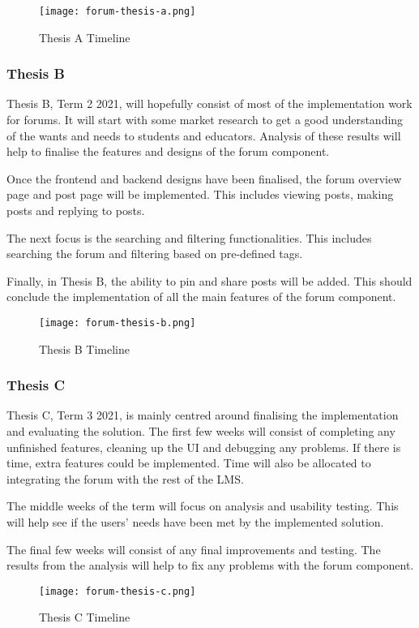 \begin{figure}[h!]
    \texttt{[image: forum-thesis-a.png]}
    \centering
    \caption{Thesis A Timeline}
\end{figure}

\newpage

\subsubsection{Thesis B}
Thesis B, Term 2 2021, will hopefully consist of most of the implementation work for forums.
It will start with some market research to get a good understanding of the wants and needs to students and educators.
Analysis of these results will help to finalise the features and designs of the forum component.

Once the frontend and backend designs have been finalised, the forum overview page and post page will be implemented.
This includes viewing posts, making posts and replying to posts.

The next focus is the searching and filtering functionalities.
This includes searching the forum and filtering based on pre-defined tags.

Finally, in Thesis B, the ability to pin and share posts will be added.
This should conclude the implementation of all the main features of the forum component.

\begin{figure}[h!]
    \texttt{[image: forum-thesis-b.png]}
    \centering
    \caption{Thesis B Timeline}
\end{figure}

\subsubsection{Thesis C}
Thesis C, Term 3 2021, is mainly centred around finalising the implementation and evaluating the solution.
The first few weeks will consist of completing any unfinished features, cleaning up the UI and debugging any problems.
If there is time, extra features could be implemented.
Time will also be allocated to integrating the forum with the rest of the LMS.

The middle weeks of the term will focus on analysis and usability testing.
This will help see if the users' needs have been met by the implemented solution.

The final few weeks will consist of any final improvements and testing.
The results from the analysis will help to fix any problems with the forum component.

\begin{figure}[h!]
    \texttt{[image: forum-thesis-c.png]}
    \centering
    \caption{Thesis C Timeline}
\end{figure}